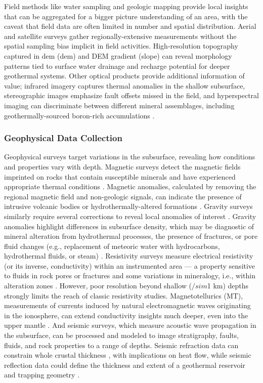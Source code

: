 Field methods like water sampling and geologic mapping provide local insights that can be aggregated for a bigger picture understanding of an area, with the caveat that field data are often limited in number and spatial distribution. Aerial and satellite surveys gather regionally-extensive measurements without the spatial sampling bias implicit in field activities. High-resolution topography captured in \acrlong{dem} (\acrshort{dem}) and DEM gradient (slope) can reveal morphology patterns tied to surface water drainage and recharge potential for deeper geothermal systems. Other optical products provide additional information of value; infrared imagery captures thermal anomalies in the shallow subsurface, stereographic images emphasize fault offsets missed in the field, and hyperspectral imaging can discriminate between different mineral assemblages, including geothermally-sourced boron-rich accumulations .

\subsubsection{Geophysical Data Collection}
Geophysical surveys target variations in the subsurface, revealing how conditions and properties vary with depth. Magnetic surveys detect the magnetic fields imprinted on rocks that contain susceptible minerals and have experienced appropriate thermal conditions \citep[~p. 248-249]{lowrie_fundamentals_2007}. Magnetic anomalies, calculated by removing the regional magnetic field and non-geologic signals, can indicate the presence of intrusive volcanic bodies or hydrothermally-altered formations \citep[~p. 146]{glassley_geothermal_2015}. Gravity surveys similarly require several corrections to reveal local anomalies of interest \citep[~p. 59-62]{lowrie_fundamentals_2007}. Gravity anomalies highlight differences in subsurface density, which may be diagnostic of mineral alteration from hydrothermal processes, the presence of fractures, or pore fluid changes (e.g., replacement of meteoric water with hydrocarbons, hydrothermal fluids, or steam) \citep[~p. 150]{glassley_geothermal_2015}. Resistivity surveys measure electrical resistivity (or its inverse, conductivity) within an instrumented area --– a property sensitive to fluids in rock pores or fractures and some variations in mineralogy, i.e., within alteration zones \citep[~p. 147]{glassley_geothermal_2015}. However, poor resolution beyond shallow ($/sim$1 km) depths strongly limits the reach of classic resistivity studies. Magnetotellurics (MT), measurements of currents induced by natural electromagnetic waves originating in the ionosphere, can extend conductivity insights much deeper, even into the upper mantle \citep[~p. 225]{lowrie_fundamentals_2007}. And seismic surveys, which measure acoustic wave propagation in the subsurface, can be processed and modeled to image stratigraphy, faults, fluids, and rock properties to a range of depths. Seismic refraction data can constrain whole crustal thickness \citep[e.g.][]{holmes_oceanic_2009}, with implications on heat flow, while seismic reflection data could define the thickness and extent of a geothermal reservoir and trapping geometry \citep[e.g.][]{cappetti_new_2005}.

